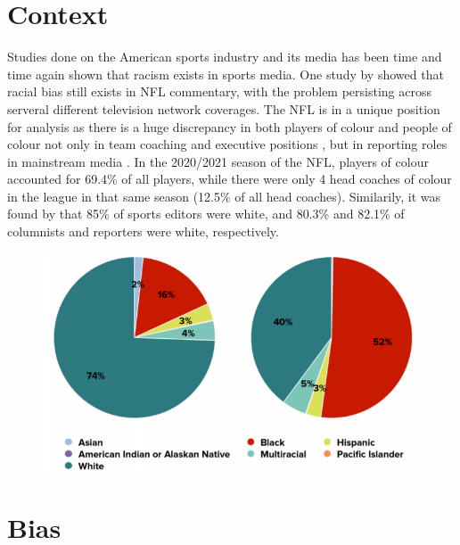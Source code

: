 \documentclass[oneside,12pt]{Classes/RoboticsLaTeX}
\begin{document}
\section{Context}
Studies done on the American sports industry and its media has been time and time again shown that racism exists in sports media. One study by \citet{Viklund2009}
showed that racial bias still exists in NFL commentary, with the problem persisting across serveral different television network coverages.
The NFL is in a unique position for analysis as there is a huge
discrepancy in both players of colour and people of colour not only in team coaching and executive positions \citep{Lapchick2020}, but in
reporting roles in mainstream media \citep{Lapchick2018}. In the 2020/2021 season of the NFL, players of colour accounted for 69.4\% of 
all players, while there were only 4 head coaches of colour in the league in that same season (12.5\% of all head coaches). Similarily, it was found by \citet{Lapchick2018} that 85\% of sports editors were white, and 80.3\% and 82.1\% of columnists and reporters were white, respectively.

\begin{figure}[hb]
  \centering
  \begin{minipage}{1\textwidth}
    \centering
    \includegraphics[width=1\linewidth]{Figures/Female_Enrolled_v_Disciplined.png}
    \label{fig:Female_Rep}
  \end{minipage}%
\end{figure}


\section{Bias}
\end{document}
